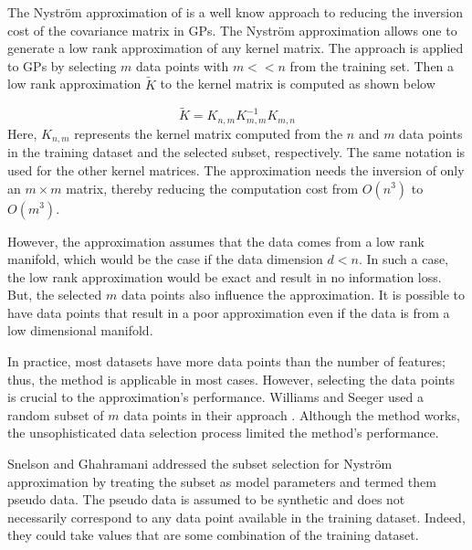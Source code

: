 \documentclass[letterpaper,11pt]{extarticle}
\begin{document}
The Nyström approximation of \cite{WilliamsS01} is a well know approach to reducing the inversion cost of the covariance matrix in GPs. The Nyström approximation allows one to generate a low rank approximation of any kernel matrix. The approach is applied to GPs by selecting $m$ data points with $m<<n$ from the training set.  Then a low rank approximation $\tilde{K}$  to the kernel matrix is computed as shown below

$$\tilde{K} = K_{n,m} K_{m,m}^{-1}  K_{m,n}$$
Here, $K_{n, m}$ represents the kernel matrix computed from the $n$ and $m$ data points in the training dataset and the selected subset, respectively. The same notation is used for the other kernel matrices. The approximation needs the inversion of only an $m \times m$ matrix, thereby reducing the computation cost from $ O(n^3)$ to  $O(m^3)$.

However, the approximation assumes that the data comes from a low rank manifold, which would be the case if the data dimension $d<n$. In such a case, the low rank approximation would be exact and result in no information loss.  But, the selected $m$ data points also influence the approximation. It is possible to have data points that result in a poor approximation even if the data is from a low dimensional manifold. 

In practice, most datasets have more data points than the number of features; thus, the method is applicable in most cases. However, selecting the data points is crucial to the approximation's performance. Williams and Seeger used a random subset of $m$ data points in their approach  \cite{WilliamsS01}. Although the method works, the unsophisticated data selection process limited the method's performance. 

Snelson and Ghahramani \cite{SnelsonEZ06} addressed the subset selection for Nyström approximation by treating the subset as model parameters and termed them pseudo data. The pseudo data is assumed to be synthetic and does not necessarily correspond to any data point available in the training dataset. Indeed, they could take values that are some combination of the training dataset. 
\end{document}
